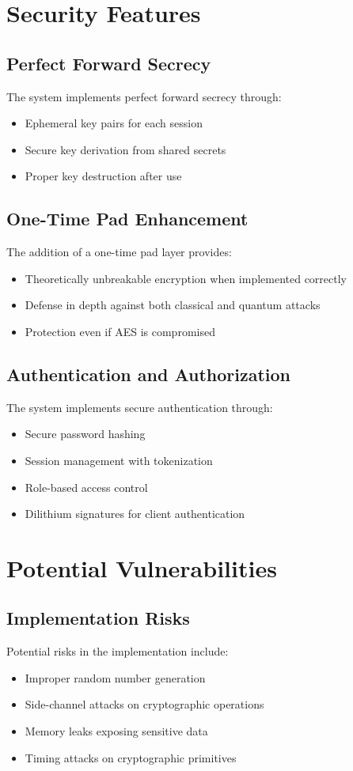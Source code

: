 \documentclass[12pt,a4paper]{report}
\begin{document}
\section{Security Features}
\subsection{Perfect Forward Secrecy}
The system implements perfect forward secrecy through:
\begin{itemize}
    \item Ephemeral key pairs for each session
    \item Secure key derivation from shared secrets
    \item Proper key destruction after use
\end{itemize}

\subsection{One-Time Pad Enhancement}
The addition of a one-time pad layer provides:
\begin{itemize}
    \item Theoretically unbreakable encryption when implemented correctly
    \item Defense in depth against both classical and quantum attacks
    \item Protection even if AES is compromised
\end{itemize}

\subsection{Authentication and Authorization}
The system implements secure authentication through:
\begin{itemize}
    \item Secure password hashing
    \item Session management with tokenization
    \item Role-based access control
    \item Dilithium signatures for client authentication
\end{itemize}

\section{Potential Vulnerabilities}
\subsection{Implementation Risks}
Potential risks in the implementation include:
\begin{itemize}
    \item Improper random number generation
    \item Side-channel attacks on cryptographic operations
    \item Memory leaks exposing sensitive data
    \item Timing attacks on cryptographic primitives
\end{itemize}
\end{document}
